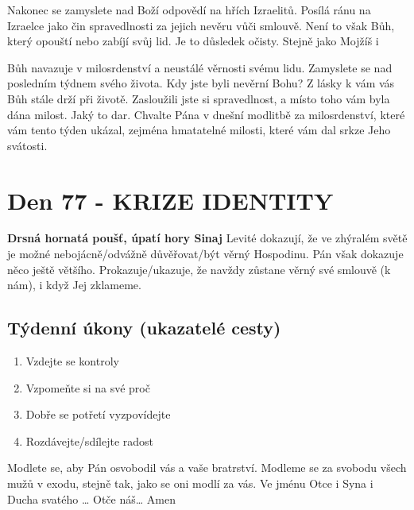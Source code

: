 \documentclass[11pt]{article}
\newcommand{\zacatekJedenactyTyden}{
\textbf{Drsná hornatá poušť, úpatí hory Sinaj} \newline 
Levité dokazují, že ve zhýralém světě je možné nebojácně/odvážně důvěřovat/být věrný Hospodinu. Pán však dokazuje něco ještě většího. Prokazuje/ukazuje, že navždy zůstane věrný své smlouvě (k nám), i když Jej zklameme.

\subsection*{Týdenní úkony (ukazatelé cesty)}
\begin{enumerate}
  \item Vzdejte se kontroly
  \item Vzpomeňte si na své proč
  \item Dobře se potřetí vyzpovídejte
  \item Rozdávejte/sdílejte radost
\end{enumerate}
Modlete se, aby Pán osvobodil vás a vaše bratrství. \newline
Modleme se za svobodu všech mužů v exodu, stejně tak, jako se oni modlí za vás.\newline
Ve jménu Otce i Syna i Ducha svatého …  Otče náš… Amen
}
\begin{document}
Nakonec se zamyslete nad Boží odpovědí na hřích Izraelitů. Posílá ránu na Izraelce jako čin spravedlnosti za jejich
nevěru vůči smlouvě. Není to však Bůh, který opouští nebo zabíjí svůj lid. Je to důsledek očisty. Stejně jako Mojžíš i

Bůh navazuje v milosrdenství a neustálé věrnosti svému lidu.
Zamyslete se nad posledním týdnem svého života. Kdy jste byli nevěrní Bohu? Z lásky k vám vás Bůh stále drží při
životě. Zasloužili jste si spravedlnost, a místo toho vám byla dána milost. Jaký to dar. Chvalte Pána v dnešní modlitbě
za milosrdenství, které vám tento týden ukázal, zejména hmatatelné milosti, které vám dal srkze Jeho svátosti.



\newpage
\section{Den 77 - KRIZE IDENTITY}
\zacatekJedenactyTyden
\end{document}

